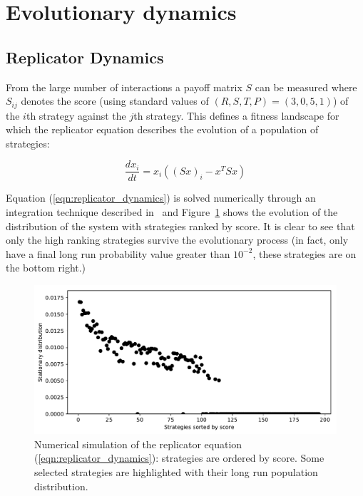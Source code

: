 \documentclass[a4paper]{article}
\begin{document}
\section{Evolutionary dynamics}\label{sec:evolutionary-dynamics}

\subsection{Replicator Dynamics}

From the large number of interactions a payoff matrix \(S\)
can be measured where \(S_{ij}\) denotes the score (using standard values of
\((R, S, T, P) = (3, 0, 5, 1)\)) of the \(i\)th strategy against the \(j\)th
strategy. This defines a fitness landscape for which the replicator equation
describes the evolution of a population of strategies:

\begin{equation}\label{eqn:replicator_dynamics}
     \frac{d x_i}{dt} = x_i ((Sx)_i - x^T S x)
\end{equation}

Equation (\ref{eqn:replicator_dynamics}) is solved numerically through an
integration technique described in~\cite{Petzold1983} and
Figure~\ref{fig:replicator_dynamics} shows the evolution of the distribution of
the system with strategies ranked by score. It is clear to see that
only the high ranking strategies survive the evolutionary process (in fact,
only have a final long run
probability value greater than \(10 ^ {-2}\), these strategies are on the bottom
right.)

\begin{figure}[!htbp]
    \centering
    \includegraphics[width=.8\textwidth]{./assets/img/replicator_dynamics/main.pdf}
    \caption{Numerical simulation of the replicator equation
    (\ref{eqn:replicator_dynamics}): strategies are ordered by score. Some
    selected strategies are highlighted with their long run population
    distribution.}
    \label{fig:replicator_dynamics}
\end{figure}
\end{document}
